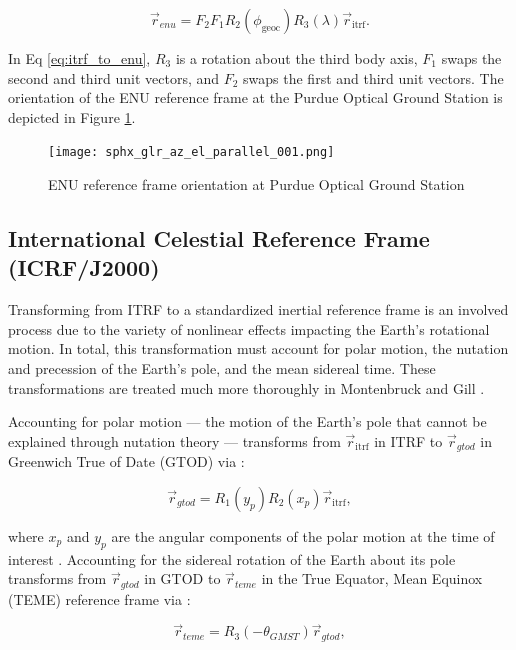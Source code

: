 \begin{equation} \label{eq:itrf_to_enu}
  \vec{r}_{enu} = F_2 F_1 R_2(\phi_\mathrm{geoc}) R_3(\lambda) \vec{r}_\mathrm{itrf}.
\end{equation}

In Eq \ref{eq:itrf_to_enu}, $R_3$ is a rotation about the third body axis, $F_1$ swaps the second and third unit vectors, and $F_2$ swaps the first and third unit vectors. The orientation of the ENU reference frame at the Purdue Optical Ground Station is depicted in Figure \ref{fig:pogs_enu}.

\begin{figure}[ht]
  \centering
  \texttt{[image: sphx\_glr\_az\_el\_parallel\_001.png]}
  \caption{ENU reference frame orientation at Purdue Optical Ground Station}
  \label{fig:pogs_enu}
\end{figure}

\subsection{International Celestial Reference Frame (ICRF/J2000)} \label{sec:teme}

Transforming from ITRF to a standardized inertial reference frame is an involved process due to the variety of nonlinear effects impacting the Earth's rotational motion. In total, this transformation must account for polar motion, the nutation and precession of the Earth's pole, and the mean sidereal time. These transformations are treated much more thoroughly in Montenbruck and Gill \cite{montenbruck2012}. 

Accounting for polar motion --- the motion of the Earth's pole that cannot be explained through nutation theory --- transforms from $\vec{r}_\mathrm{itrf}$ in ITRF to $\vec{r}_{gtod}$ in Greenwich True of Date (GTOD) via \cite{vallado4ed}:

\begin{equation} \label{eq:itrf_to_gtod}
  \vec{r}_{gtod} = R_1(y_p) R_2(x_p) \vec{r}_\mathrm{itrf},
\end{equation}

where $x_p$ and $y_p$ are the angular components of the polar motion at the time of interest \cite{frueh2019notes}. Accounting for the sidereal rotation of the Earth about its pole transforms from $\vec{r}_{gtod}$ in GTOD to $\vec{r}_{teme}$ in the True Equator, Mean Equinox (TEME) reference frame via \cite{frueh2019notes}:

\begin{equation} \label{eq:gtod_to_teme}
  \vec{r}_{teme} = R_3(-\theta_{GMST}) \vec{r}_{gtod},
\end{equation}

